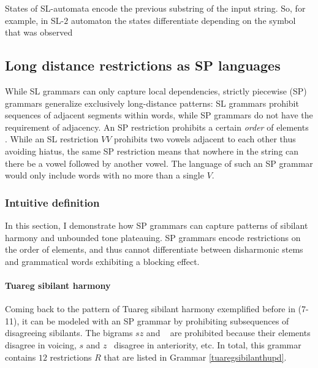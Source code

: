 States of SL-automata encode the previous substring of the input string.
So, for example, in SL-$2$ automaton the states differentiate depending on the symbol that was observed 


\subsection{Long distance restrictions as SP languages}
\label{SPldrestrictions}


While SL grammars can only capture local dependencies, strictly piecewise (SP) grammars generalize exclusively long-distance patterns: %
SL grammars prohibit sequences of adjacent segments within words, while SP grammars do not have the requirement of adjacency.
An SP restriction prohibits a certain \emph{order} of elements \citep{Rogers-HeinzEtAl-2010-LPTSS,Fu2011}. 
While an SL restriction $VV$ prohibits two vowels adjacent to each other thus avoiding hiatus, the same SP restriction means that nowhere in the string can there be a vowel followed by another vowel.
The language of such an SP grammar would only include words with no more than a single $V$.


\subsubsection{Intuitive definition}

In this section, I demonstrate how SP grammars can capture patterns of sibilant harmony and unbounded tone plateauing.
SP grammars encode restrictions on the order of elements, and thus cannot differentiate between disharmonic stems and grammatical words exhibiting a blocking effect.





\paragraph{Tuareg sibilant harmony}
Coming back to the pattern of Tuareg sibilant harmony exemplified before in (7-11), it can be modeled with an SP grammar by prohibiting subsequences of disagreeing sibilants.
The bigrams $sz$ and \textesh\textyogh~ are prohibited because their elements disagree in voicing, \textesh$s$ and $z$\textyogh~ disagree in anteriority, etc.
In total, this grammar contains $12$ restrictions $R$ that are listed in Grammar \ref{tuaregsibilanthupd}.

